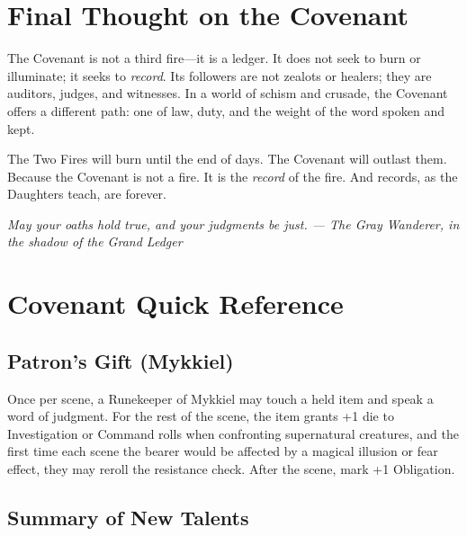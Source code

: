 \documentclass{book}
\newcommand{\citation}[1]{\textcolor{marginalia}{\small\textit{#1}}}
\begin{document}
\chapter*{Final Thought on the Covenant}

The Covenant is not a third fire---it is a ledger. It does not seek to burn or illuminate; it seeks to \textit{record}. Its followers are not zealots or healers; they are auditors, judges, and witnesses. In a world of schism and crusade, the Covenant offers a different path: one of law, duty, and the weight of the word spoken and kept.

The Two Fires will burn until the end of days. The Covenant will outlast them. Because the Covenant is not a fire. It is the \textit{record} of the fire. And records, as the Daughters teach, are forever.

\citation{May your oaths hold true, and your judgments be just. --- The Gray Wanderer, in the shadow of the Grand Ledger}

\appendix

\chapter{Covenant Quick Reference}

\section{Patron's Gift (Mykkiel)}

Once per scene, a Runekeeper of Mykkiel may touch a held item and speak a word of judgment. For the rest of the scene, the item grants +1 die to Investigation or Command rolls when confronting supernatural creatures, and the first time each scene the bearer would be affected by a magical illusion or fear effect, they may reroll the resistance check. After the scene, mark +1 Obligation.

\section{Summary of New Talents}
\end{document}
